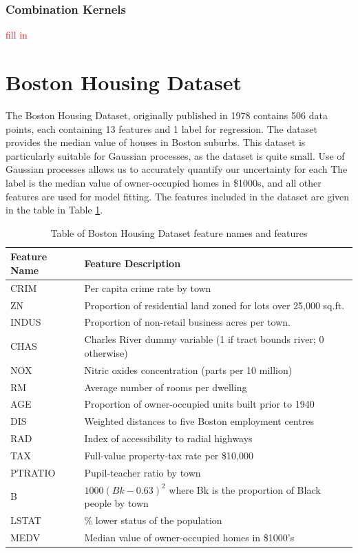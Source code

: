 \documentclass{article}
\newcommand{\todo}[1]{\textcolor{red}{#1}}
\begin{document}
\subsubsection{Combination Kernels}

\todo{fill in}

\section{Boston Housing Dataset}

The Boston Housing Dataset, originally published in 1978 contains 506 data points, each containing 13 features and 1
label for regression\cite{harrison_hedonic_1978}. The dataset provides the median value of houses in Boston suburbs.
This dataset is particularly suitable for Gaussian processes, as the dataset is quite small. Use of Gaussian processes
allows us to accurately quantify our uncertainty for each The label is the median value of owner-occupied homes in \$1000s, and
all other features are used for model fitting. The features included in the dataset are given in the table in Table
\ref{table:bhd_feat}.

\begin{table}[H]
  \centering
  \begin{tabular}{ || m{3cm} | m{7cm} || }
    \hline
    \textbf{Feature Name} & \textbf{Feature Description} \\
    \hline \hline
    CRIM    & Per capita crime rate by town \\
    \hline
    ZN      & Proportion of residential land zoned for lots over 25,000 sq.ft. \\
    \hline
    INDUS   & Proportion of non-retail business acres per town. \\
    \hline
    CHAS    & Charles River dummy variable (1 if tract bounds river; 0 otherwise) \\
    \hline
    NOX     & Nitric oxides concentration (parts per 10 million) \\
    \hline
    RM      & Average number of rooms per dwelling \\
    \hline
    AGE     & Proportion of owner-occupied units built prior to 1940 \\
    \hline
    DIS     & Weighted distances to five Boston employment centres \\
    \hline
    RAD     & Index of accessibility to radial highways \\
    \hline
    TAX     & Full-value property-tax rate per \$10,000 \\
    \hline
    PTRATIO & Pupil-teacher ratio by town \\
    \hline
    B       & $1000(Bk - 0.63)^2$ where Bk is the proportion of Black people by town \\
    \hline
    LSTAT   & \% lower status of the population \\
    \hline
    MEDV    & Median value of owner-occupied homes in \$1000's \\
    \hline
  \end{tabular}
  \caption{Table of Boston Housing Dataset feature names and features}
  \label{table:bhd_feat}
\end{table}
\end{document}
